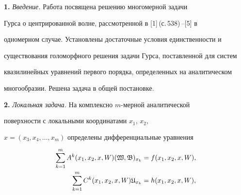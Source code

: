 




\maketitle


\label{begin}


{\bf 1.} {\it Введение.} Работа посвящена решению многомерной задачи


Гурса о центрированной волне, рассмотренной в [1]\,(с.\,538)\,--[5] в


одномерном случае. Установлены достаточные условия единственности и


существования голоморфного решения задачи Гурса, поставленной для систем


квазилинейных уравнений первого порядка, определенных на аналитическом


многообразии. Решена задача в общей постановке.


\medskip





{\bf 2.} {\it Локальная задача.} На комплексно $m$-мерной аналитической


поверхности с локальными координатами $x_1$, $x_2$,


$x=(x_3,x_4,\dotsc,x_m)$ определены дифференциальные уравнения


\begin{equation}


\begin{split}


\sum^m_{k=1}A^k(x_1,x_2,x,W)(\frak W,\frak B)_{x_k}&=


f(x_1,x_2,x,W),\\


\sum^m_{k=1}C^k(x_1,x_2,x,W)\frak U_{x_k}&=


h(x_1,x_2,x,W),


\end{split}


\end{equation}


